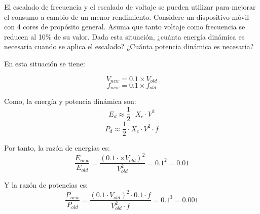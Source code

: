 \begin{acexercise}
\end{acexercise}

El escalado de frecuencia y el escalado de voltaje se pueden utilizar para
mejorar el consumo a cambio de un menor rendimiento. Considere un dispositivo
móvil con 4 cores de propósito general. Asuma que tanto voltaje como frecuencia
se reducen al 10\% de su valor. Dada esta situación,
¿cuánta energía dinámica es necesaria cuando se aplica el escalado? ¿Cuánta
potencia dinámica es necesaria?

\begin{acsolution}
\end{acsolution}

En esta situación se tiene:

\[V_{new} = 0.1 \times V_{old}\]
\[f_{new} = 0.1 \times f_{old}\]

Como, la energía y potencia dinámica son:
\[
E_d \approx \frac{1}{2} \cdot X_c \cdot V^2
\]
\[
P_d \approx \frac{1}{2} \cdot X_c \cdot V^2 \cdot f
\]

Por tanto, la razón de energías es:
\[
\frac{E_{new}}{E_{old}} =
\frac{(0.1 \cdot \times V_{old})^2}{V_{old}^2} =
0.1^2 =
0.01
\] 

Y la razón de potencias es:
\[
\frac{P_{new}}{P_{old}} =
\frac{(0.1 \cdot V_{old})^2 \cdot 0.1 \cdot f}{V_{old}^2 \cdot f} =
0.1^3 =
0.001
\]
